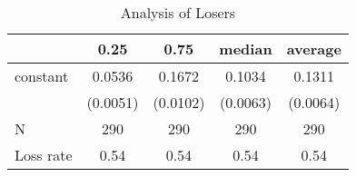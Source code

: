 \begin{table}
\caption{Analysis of Losers}
\begin{center}
\begin{tabular}{lcccc}
\hline
          &   0.25   &   0.75   &  median  & average   \\
\midrule
\midrule
constant  & 0.0536   & 0.1672   & 0.1034   & 0.1311    \\
          & (0.0051) & (0.0102) & (0.0063) & (0.0064)  \\
N         & 290      & 290      & 290      & 290       \\
Loss rate & 0.54     & 0.54     & 0.54     & 0.54      \\
\hline
\end{tabular}
\end{center}
\end{table}
